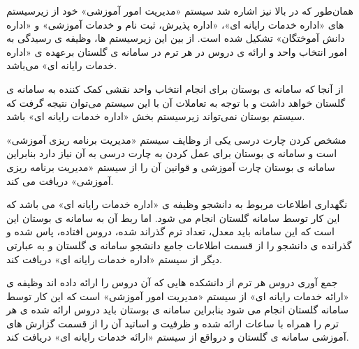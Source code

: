 \documentclass[oneside]{book}
\begin{document}
 
 همان‌طور که در بالا نیز اشاره شد سیستم «مدیریت امور آموزشی» خود از زیرسیستم های «اداره خدمات رایانه ای»، «اداره پذیرش، ثبت نام و خدمات آموزشی» و «اداره دانش آموختگان» تشکیل شده است. از بین این زیرسیستم ها، وظیفه ی رسیدگی به امور انتخاب واحد و ارائه ی دروس در هر ترم در سامانه ی گلستان برعهده ی «اداره خدمات رایانه ای» می‌باشد.
 
 از آنجا که سامانه ی بوستان برای انجام انتخاب واحد نقشی کمک کننده به سامانه ی گلستان خواهد داشت  و با توجه به تعاملات آن با این سیستم می‌توان نتیجه گرفت که سیستم بوستان نمی‌تواند زیرسیستم بخش «اداره خدمات رایانه ای» باشد.
 
  مشخص کردن چارت درسی یکی از وظایف سیستم «مدیریت برنامه ریزی آموزشی» است و سامانه ی بوستان برای عمل کردن به چارت درسی به آن نیاز دارد بنابراین سامانه ی بوستان چارت آموزشی و قوانین آن را از سیستم «مدیریت برنامه ریزی آموزشی» دریافت می کند.
  
  نگهداری اطلاعات مربوط به دانشجو وظیفه ی «اداره خدمات رایانه ای» می باشد که این کار توسط سامانه گلستان انجام می شود. اما ربط آن به سامانه ی بوستان این است که این سامانه  باید معدل، تعداد ترم گذراند شده، دروس افتاده، پاس شده و گذرانده ی دانشجو را از قسمت اطلاعات جامع دانشجو سامانه ی گلستان و به عبارتی دیگر از سیستم «اداره خدمات رایانه ای» دریافت کند.
  
  جمع آوری دروس هر ترم از دانشکده هایی که آن دروس را ارائه داده اند وظیفه ی «ارائه خدمات رایانه ای» از سیستم «مدیریت امور آموزشی» است که این کار توسط سامانه گلستان انجام می شود بنابراین سامانه ی بوستان باید دروس ارائه شده ی هر ترم را همراه با ساعات ارائه شده و ظرفیت و اساتید آن را از قسمت گزارش های آموزشی سامانه ی گلستان و درواقع از سیستم «ارائه خدمات رایانه ای» دریافت کند.
 
 
\end{document}
